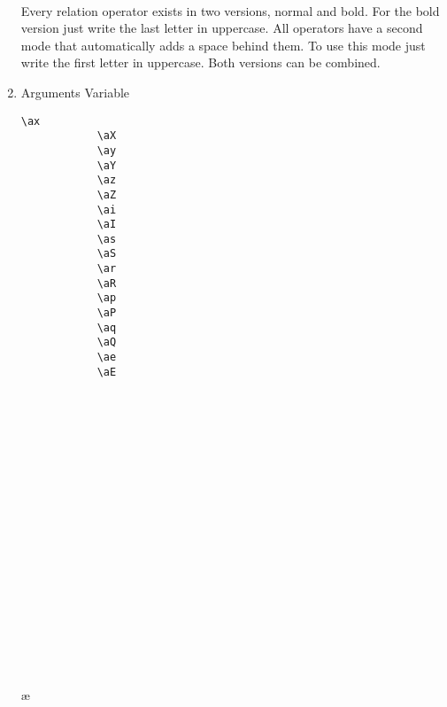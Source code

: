 \documentclass[10pt, a4paper]{article}
\begin{document}
\begin{enumerate}
\begin{center}
\begin{minipage}[h][4cm][t]{15em}
\begin{fgls}
					\rs\\
					\rse
				\end{fgls}
			\end{minipage}
		\end{center}
		Every relation operator exists in two versions, normal and bold. For the bold version just write the last letter in uppercase. All operators have a second mode that automatically adds a space behind them. To use this mode just write the first letter in uppercase. Both versions can be combined.
		\item Arguments Variable
		\begin{center}
			\begin{minipage}[h][8cm][t]{15em}
				\begin{lstlisting}[style=B]
			\ax
			\aX
			\ay
			\aY
			\az
			\aZ
			\ai
			\aI
			\as
			\aS
			\ar
			\aR
			\ap
			\aP
			\aq
			\aQ
			\ae
			\aE
				\end{lstlisting}
			\end{minipage}
			\begin{minipage}[h][8cm][t]{15em}
				\begin{fgls}
					\ \\
					\ax\\
					\aX\\
					\ay\\
					\aY\\
					\az\\
					\aZ\\
					\ai\\
					\aI\\
					\as\\
					\aS\\
					\ar\\
					\aR\\
					\ap\\
					\aP\\
					\aq\\
					\aQ\\
					\ae\\
					\aE
				\end{fgls}
			\end{minipage}
		\end{center}
		

\end{enumerate}
\end{document}
